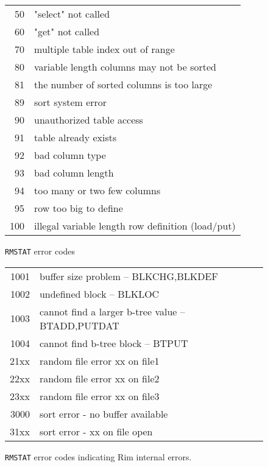 \documentclass[11pt,a4paper]{report}
\begin{document}
\begin{figure}[p]
\begin{tabular}{rl}
 50& "select" not called                                     \\
 60& "get" not called                                      \\
 70& multiple table index out of range                \\
 80& variable length columns may not be sorted          \\
 81& the number of sorted columns is too large          \\
 89& sort system error                                     \\
 90& unauthorized table access                          \\
 91& table already exists                               \\
 92& bad column type                                    \\
 93& bad column length                                  \\
 94& too many or two few columns                        \\
 95& row too big to define                                 \\
100& illegal variable length row definition (load/put)     \\
\end{tabular}
\caption{{\tt RMSTAT} error codes}
\label{rmstat}
\end{figure}
 
\begin{figure}[t]
\centering
\begin{tabular}{rl}
1001& buffer size problem -- BLKCHG,BLKDEF                 \\
1002& undefined block -- BLKLOC                            \\
1003& cannot find a larger b-tree value -- BTADD,PUTDAT    \\
1004& cannot find b-tree block -- BTPUT                    \\
21xx& random file error xx on file1                        \\
22xx& random file error xx on file2                        \\
23xx& random file error xx on file3  \\
3000& sort error - no buffer available \\
31xx& sort error - xx on file open
\end{tabular}
\caption{{\tt RMSTAT} error codes indicating Rim internal errors.}
\label{rmstat-system}
\end{figure}
 
\end{document}

